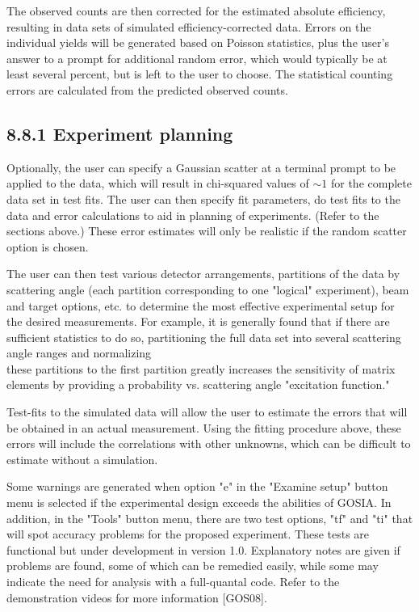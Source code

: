 \documentclass[10pt]{article}
\begin{document}
The observed counts are then corrected for the estimated absolute efficiency, resulting in data sets of simulated efficiency-corrected data. Errors on the individual yields will be generated based on Poisson statistics, plus the user's answer to a prompt for additional random error, which would typically be at least several percent, but is left to the user to choose. The statistical counting errors are calculated from the predicted observed counts.

\subsection*{8.8.1 Experiment planning}
Optionally, the user can specify a Gaussian scatter at a terminal prompt to be applied to the data, which will result in chi-squared values of $\sim 1$ for the complete data set in test fits. The user can then specify fit parameters, do test fits to the data and error calculations to aid in planning of experiments. (Refer to the sections above.) These error estimates will only be realistic if the random scatter option is chosen.

The user can then test various detector arrangements, partitions of the data by scattering angle (each partition corresponding to one "logical" experiment), beam and target options, etc. to determine the most effective experimental setup for the desired measurements. For example, it is generally found that if there are sufficient statistics to do so, partitioning the full data set into several scattering angle ranges and normalizing\\
these partitions to the first partition greatly increases the sensitivity of matrix elements by providing a probability vs. scattering angle "excitation function."

Test-fits to the simulated data will allow the user to estimate the errors that will be obtained in an actual measurement. Using the fitting procedure above, these errors will include the correlations with other unknowns, which can be difficult to estimate without a simulation.

Some warnings are generated when option "e" in the "Examine setup" button menu is selected if the experimental design exceeds the abilities of GOSIA. In addition, in the "Tools" button menu, there are two test options, "tf" and "ti" that will spot accuracy problems for the proposed experiment. These tests are functional but under development in version 1.0. Explanatory notes are given if problems are found, some of which can be remedied easily, while some may indicate the need for analysis with a full-quantal code. Refer to the demonstration videos for more information [GOS08].
\end{document}
